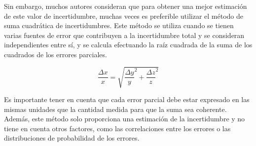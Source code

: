 Sin embargo, muchos autores consideran que para obtener una mejor estimación de este valor de incertidumbre, muchas veces es preferible utilizar el método de suma cuadrática de incertidumbres. Este método se utiliza cuando se tienen varias fuentes de error que contribuyen a la incertidumbre total y se consideran independientes entre sí, y se calcula efectuando la raíz cuadrada de la suma de los cuadrados de los errores parciales. 

\begin{equation}
    \frac{\Delta x}{x} = \sqrt{{\frac{\Delta y}{y}}^2 + {\frac{\Delta z}{z}}^2} 
    \label{sumaErr}
\end{equation}

Es importante tener en cuenta que cada error parcial debe estar expresado en las mismas unidades que la cantidad medida para que la suma sea coherente. Además, este método solo proporciona una estimación de la incertidumbre y no tiene en cuenta otros factores, como las correlaciones entre los errores o las distribuciones de probabilidad de los errores.